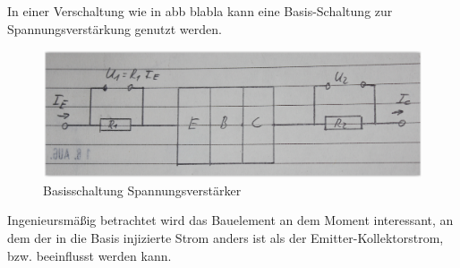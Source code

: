 \documentclass[12pt,a4paper]{report}%
\numberwithin{equation}{section}
\numberwithin{equation}{subsection}
\begin{document}
    In einer Verschaltung wie in abb blabla kann eine Basis-Schaltung zur Spannungsverstärkung genutzt werden.
    \begin{figure}[H]
		  \centering
		  \captionsetup{justification=centering}
		  \includegraphics[width=0.6\linewidth]{bpt_basissch_spannungsverst.png}
		  \caption{Basisschaltung Spannungsverstärker}
		  \label{fig:bpt_basissch_spannungsverst}
		\end{figure}
    Ingenieursmäßig betrachtet wird das Bauelement an dem Moment interessant, an dem der in die Basis injizierte Strom anders ist als der Emitter-Kollektorstrom, bzw. beeinflusst werden kann. \newline
    
\end{document}
